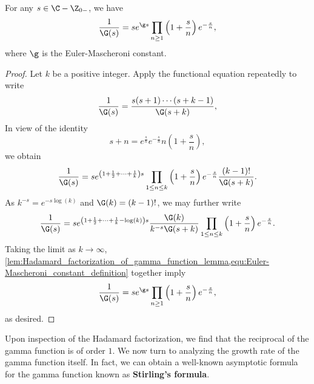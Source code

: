   \begin{theorem}\label{thm:Hadamard_factorization_for_reciprocal_of_gamma}
    For any \(s \in \C-\Z_{0-}\), we have
    \[
      \frac{1}{\G(s)} = se^{\g s}\prod_{n \ge 1}\left(1+\frac{s}{n}\right)e^{-\frac{s}{n}},
    \]
    where \(\g\) is the Euler-Mascheroni constant.
  \end{theorem}
  \begin{proof}
    Let \(k\) be a positive integer. Apply the functional equation repeatedly to write
    \[
      \frac{1}{\G(s)} = \frac{s(s+1) \cdots (s+k-1)}{\G(s+k)},
    \]
    In view of the identity
    \[
      s+n = e^{\frac{s}{n}}e^{-\frac{s}{n}}n\left(1+\frac{s}{n}\right),
    \]
    we obtain
    \[
      \frac{1}{\G(s)} = se^{\left(1+\frac{1}{2}+\cdots+\frac{1}{k}\right)s}\prod_{1 \le n \le k}\left(1+\frac{s}{n}\right)e^{-\frac{s}{n}}\frac{(k-1)!}{\G(s+k)}.
    \]
    As \(k^{-s}= e^{-s\log(k)}\) and \(\G(k) = (k-1)!\), we may further write
    \[
      \frac{1}{\G(s)} = se^{\left(1+\frac{1}{2}+\cdots+\frac{1}{k}-\log(k)\right)s}\frac{\G(k)}{k^{-s}\G(s+k)}\prod_{1 \le n \le k}\left(1+\frac{s}{n}\right)e^{-\frac{s}{n}}.
    \]
    Taking the limit as \(k \to \infty\), \cref{lem:Hadamard_factorization_of_gamma_function_lemma,equ:Euler-Mascheroni_constant_definition} together imply
    \[
      \frac{1}{\G(s)} = se^{\g s}\prod_{n \ge 1}\left(1+\frac{s}{n}\right)e^{-\frac{s}{n}},
    \]
    as desired.
  \end{proof}

  Upon inspection of the Hadamard factorization, we find that the reciprocal of the gamma function is of order \(1\). We now turn to analyzing the growth rate of the gamma function itself. In fact, we can obtain a well-known asymptotic formula for the gamma function known as \textbf{Stirling's formula}.

